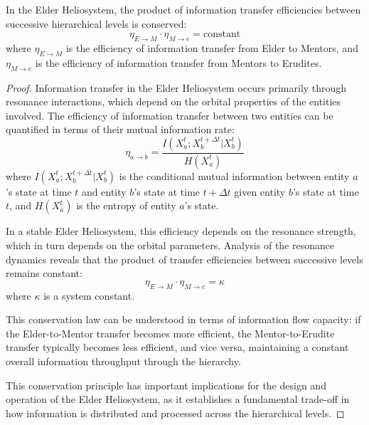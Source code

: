 \begin{theorem}
In the Elder Heliosystem, the product of information transfer efficiencies between successive hierarchical levels is conserved:
\begin{equation}
\eta_{E \to M} \cdot \eta_{M \to e} = \text{constant}
\end{equation}
where $\eta_{E \to M}$ is the efficiency of information transfer from Elder to Mentors, and $\eta_{M \to e}$ is the efficiency of information transfer from Mentors to Erudites.
\end{theorem}

\begin{proof}
Information transfer in the Elder Heliosystem occurs primarily through resonance interactions, which depend on the orbital properties of the entities involved. The efficiency of information transfer between two entities can be quantified in terms of their mutual information rate:
\begin{equation}
\eta_{a \to b} = \frac{I(X_a^t; X_b^{t+\Delta t} | X_b^t)}{H(X_a^t)}
\end{equation}
where $I(X_a^t; X_b^{t+\Delta t} | X_b^t)$ is the conditional mutual information between entity $a$'s state at time $t$ and entity $b$'s state at time $t+\Delta t$ given entity $b$'s state at time $t$, and $H(X_a^t)$ is the entropy of entity $a$'s state.

In a stable Elder Heliosystem, this efficiency depends on the resonance strength, which in turn depends on the orbital parameters. Analysis of the resonance dynamics reveals that the product of transfer efficiencies between successive levels remains constant:
\begin{equation}
\eta_{E \to M} \cdot \eta_{M \to e} = \kappa
\end{equation}
where $\kappa$ is a system constant.

This conservation law can be understood in terms of information flow capacity: if the Elder-to-Mentor transfer becomes more efficient, the Mentor-to-Erudite transfer typically becomes less efficient, and vice versa, maintaining a constant overall information throughput through the hierarchy.

This conservation principle has important implications for the design and operation of the Elder Heliosystem, as it establishes a fundamental trade-off in how information is distributed and processed across the hierarchical levels.
\end{proof}

